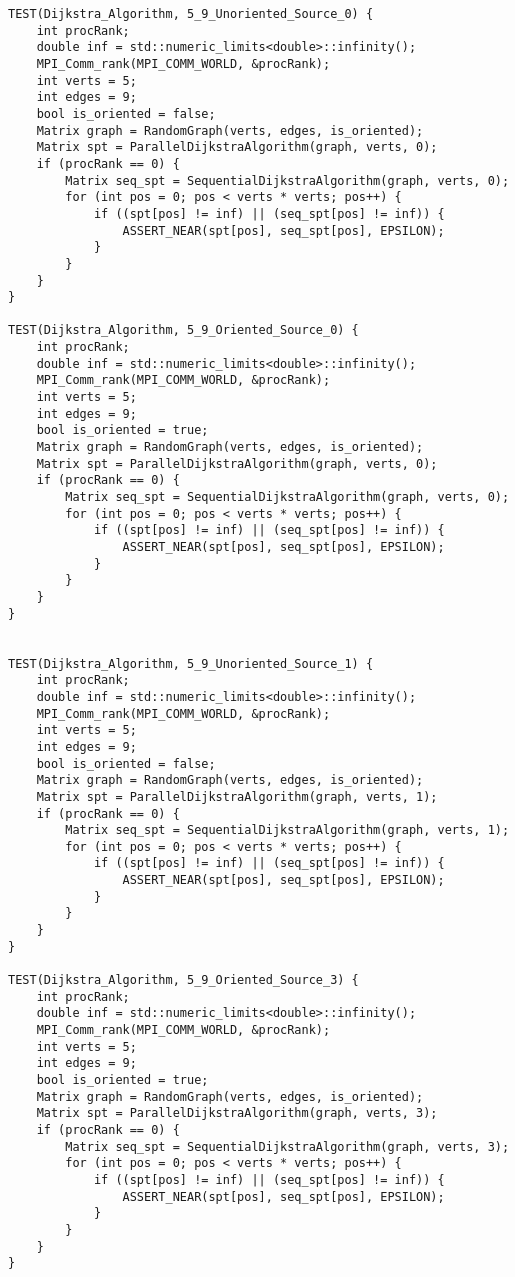 \documentclass{report}
\begin{document}
\begin{lstlisting}
TEST(Dijkstra_Algorithm, 5_9_Unoriented_Source_0) {
    int procRank;
    double inf = std::numeric_limits<double>::infinity();
    MPI_Comm_rank(MPI_COMM_WORLD, &procRank);
    int verts = 5;
    int edges = 9;
    bool is_oriented = false;
    Matrix graph = RandomGraph(verts, edges, is_oriented);
    Matrix spt = ParallelDijkstraAlgorithm(graph, verts, 0);
    if (procRank == 0) {
        Matrix seq_spt = SequentialDijkstraAlgorithm(graph, verts, 0);
        for (int pos = 0; pos < verts * verts; pos++) {
            if ((spt[pos] != inf) || (seq_spt[pos] != inf)) {
                ASSERT_NEAR(spt[pos], seq_spt[pos], EPSILON);
            }
        }
    }
}

TEST(Dijkstra_Algorithm, 5_9_Oriented_Source_0) {
    int procRank;
    double inf = std::numeric_limits<double>::infinity();
    MPI_Comm_rank(MPI_COMM_WORLD, &procRank);
    int verts = 5;
    int edges = 9;
    bool is_oriented = true;
    Matrix graph = RandomGraph(verts, edges, is_oriented);
    Matrix spt = ParallelDijkstraAlgorithm(graph, verts, 0);
    if (procRank == 0) {
        Matrix seq_spt = SequentialDijkstraAlgorithm(graph, verts, 0);
        for (int pos = 0; pos < verts * verts; pos++) {
            if ((spt[pos] != inf) || (seq_spt[pos] != inf)) {
                ASSERT_NEAR(spt[pos], seq_spt[pos], EPSILON);
            }
        }
    }
}


TEST(Dijkstra_Algorithm, 5_9_Unoriented_Source_1) {
    int procRank;
    double inf = std::numeric_limits<double>::infinity();
    MPI_Comm_rank(MPI_COMM_WORLD, &procRank);
    int verts = 5;
    int edges = 9;
    bool is_oriented = false;
    Matrix graph = RandomGraph(verts, edges, is_oriented);
    Matrix spt = ParallelDijkstraAlgorithm(graph, verts, 1);
    if (procRank == 0) {
        Matrix seq_spt = SequentialDijkstraAlgorithm(graph, verts, 1);
        for (int pos = 0; pos < verts * verts; pos++) {
            if ((spt[pos] != inf) || (seq_spt[pos] != inf)) {
                ASSERT_NEAR(spt[pos], seq_spt[pos], EPSILON);
            }
        }
    }
}

TEST(Dijkstra_Algorithm, 5_9_Oriented_Source_3) {
    int procRank;
    double inf = std::numeric_limits<double>::infinity();
    MPI_Comm_rank(MPI_COMM_WORLD, &procRank);
    int verts = 5;
    int edges = 9;
    bool is_oriented = true;
    Matrix graph = RandomGraph(verts, edges, is_oriented);
    Matrix spt = ParallelDijkstraAlgorithm(graph, verts, 3);
    if (procRank == 0) {
        Matrix seq_spt = SequentialDijkstraAlgorithm(graph, verts, 3);
        for (int pos = 0; pos < verts * verts; pos++) {
            if ((spt[pos] != inf) || (seq_spt[pos] != inf)) {
                ASSERT_NEAR(spt[pos], seq_spt[pos], EPSILON);
            }
        }
    }
}


\end{lstlisting}
\end{document}
